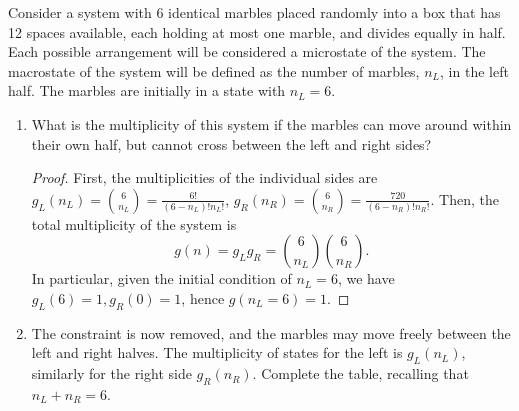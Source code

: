 \documentclass[12pt]{article}
\newenvironment{problem}[2][Problem]{\begin{trivlist}
    \item[\hskip \labelsep {\bfseries #1}\hskip \labelsep {\bfseries #2.}]}{\end{trivlist}}
\theoremstyle{definition}
\begin{document}
\begin{problem}{3}
  Consider a system with 6 identical marbles placed randomly into a box that has 12 spaces available, each holding at most one marble, and divides equally in half.
  Each possible arrangement will be considered a microstate of the system.
  The macrostate of the system will be defined as the number of marbles, \( n_L \), in the left half.
  The marbles are initially in a state with \( n_L = 6 \).

  \begin{enumerate}[label=(\alph*)]
    \item What is the multiplicity of this system if the marbles can move around within their own half, but cannot cross between the left and right sides?
          \begin{proof}
First, the multiplicities of the individual sides are \( g_L(n_L) = \binom{6}{n_L} = \frac{6!}{(6-n_L)! n_L!}\), \( g_R(n_R) = \binom{6}{n_{R}} = \frac{720}{(6 - n_R)! n_R!} \).
Then, the total multiplicity of the system is
\begin{equation}
\label{eq:9}
g(n) = g_Lg_R = \binom{6}{n_L}\binom{6}{n_R}.
\end{equation}
In particular, given the initial condition of \( n_L = 6 \), we have
\( g_L(6) = 1, g_R(0) = 1 \), hence \( g(n_L=6) = 1 \).
          \end{proof}
    \item The constraint is now removed, and the marbles may move freely between the left and right halves.
          The multiplicity of states for the left is \( g_L(n_L) \), similarly for the right side \( g_R(n_R) \).
          Complete the table, recalling that \( n_L+n_R = 6 \).
          \begin{center}


\end{center}
\end{enumerate}
\end{problem}
\end{document}
